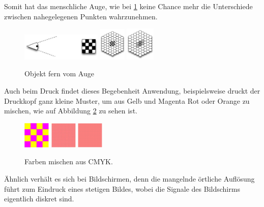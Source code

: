  Somit hat das menschliche Auge, wie bei \ref{fig:Objekt fern vom Auge} keine Chance mehr die Unterschiede zwischen nahegelegenen Punkten wahrzunehmen.

\begin{figure}[ht]
  \centering
  \includegraphics[width=1.5in]{images/AugeObjektFern}
  \includegraphics[width=0.5in]{images/SinneszelleObjektFern}
  \includegraphics[width=0.55in]{images/AbbildungAufSinneszelleObjektFern}
  \caption{Objekt fern vom Auge}
  \label{fig:Objekt fern vom Auge}
  \cite{rehfeld}
\end{figure}

Auch beim Druck findet dieses Begebenheit Anwendung, beispielsweise druckt der Druckkopf ganz kleine Muster, um aus Gelb und Magenta Rot oder Orange zu mischen, wie auf Abbildung \ref{fig:Aus Grundfarben wird neue eine Farbe} zu sehen ist.

\begin{figure}[ht]
  \centering
  \includegraphics[width=0.5in]{images/gelbMagentaMusterGrob}
  \includegraphics[width=0.5in]{images/gelbMagentaMusterFeiner}
  \includegraphics[width=0.5in]{images/gelbMagentaMusterFein}
  \caption{Farben mischen aus CMYK.}
  \label{fig:Aus Grundfarben wird neue eine Farbe}
  \cite{rehfeld}
\end{figure}

Ähnlich verhält es sich bei Bildschirmen, denn die mangelnde örtliche Auflösung führt zum Eindruck eines stetigen Bildes, wobei die Signale des Bildschirms eigentlich diskret sind.

